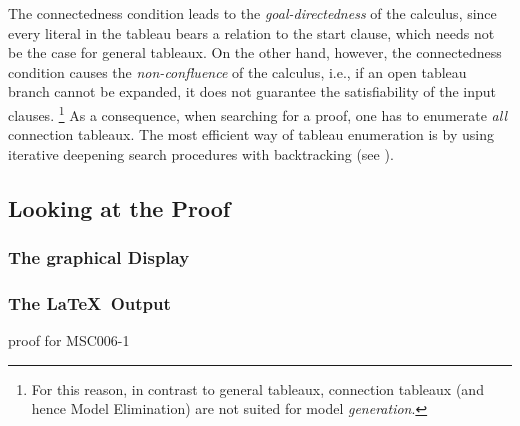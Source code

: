 The connectedness condition leads to the {\em goal-directedness\/} of
the calculus, since every literal in the tableau bears a relation to the start 
clause, which needs not be the case for general tableaux. 
On the other hand, however, the connectedness condition causes the 
{\em non-confluence\/} of the calculus, 
i.e., if an open tableau branch cannot be expanded, 
it does not guarantee the satisfiability of the input clauses.%
\footnote{For this reason, in contrast to general tableaux,
connection tableaux (and hence Model Elimination)
are not suited for model {\em generation}.}
As a consequence, when searching for a proof, one has to enumerate {\em all\/} 
connection tableaux.
The most efficient way of tableau enumeration is by using 
iterative deepening search procedures with backtracking
(see \cite{Sti88}).

\subsection{Looking at the Proof}
\subsubsection{The graphical Display}
\subsubsection{The \LaTeX\ Output}

\begin{table}[htb]
proof for MSC006-1
\caption{proof for MSC006-1}
\label{tab:started:nonob-proof}
\end{table}

